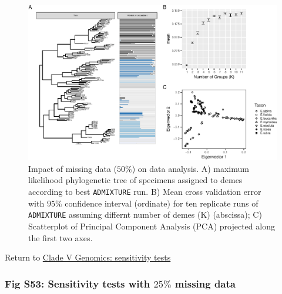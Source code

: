 \documentclass[
  11pt,
]{article}
\begin{document}
\begin{figure}
\includegraphics{Supplementary_Material_files/figure-latex/cladeVgenomicSensitivityAnalysesMiddleplots-1} \caption{Impact of missing data ($50\%$) on data analysis. A) maximum likelihood phylogenetic tree of specimens assigned to demes according to best \texttt{ADMIXTURE} run. B) Mean cross validation error with $95\%$ confidence interval (ordinate) for ten replicate runs of \texttt{ADMIXTURE} assuming differnt number of demes (K) (abscissa); C) Scatterplot of Principal Component Analysis (PCA) projected along the first two axes.}\label{fig:cladeVgenomicSensitivityAnalysesMiddleplots}
\end{figure}

Return to \protect\hyperlink{sensitivity-tests-4}{Clade V Genomics: sensitivity tests}
\pagebreak

\hypertarget{fig-s53-sensitivity-tests-with-25-missing-data}{%
\subsubsection{\texorpdfstring{Fig S53: Sensitivity tests with \(25\%\) missing data}{Fig S53: Sensitivity tests with 25\textbackslash\% missing data}}\label{fig-s53-sensitivity-tests-with-25-missing-data}}
\end{document}
